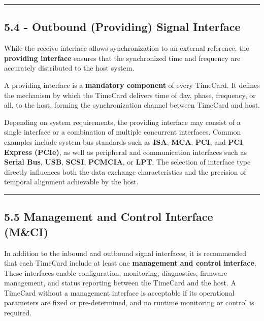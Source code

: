 \documentclass[
]{article}
\begin{document}
\begin{center}\rule{0.5\linewidth}{0.5pt}\end{center}

\subsection{5.4 - Outbound (Providing) Signal
Interface}\label{outbound-providing-signal-interface}

While the receive interface allows synchronization to an external
reference, the \textbf{providing interface} ensures that the
synchronized time and frequency are accurately distributed to the host
system.

A providing interface is a \textbf{mandatory component} of every
TimeCard. It defines the mechanism by which the TimeCard delivers time
of day, phase, frequency, or all, to the host, forming the
synchronization channel between TimeCard and host.

Depending on system requirements, the providing interface may consist of
a single interface or a combination of multiple concurrent interfaces.
Common examples include system bus standards such as \textbf{ISA},
\textbf{MCA}, \textbf{PCI}, and \textbf{PCI Express (PCIe)}, as well as
peripheral and communication interfaces such as \textbf{Serial Bus},
\textbf{USB}, \textbf{SCSI}, \textbf{PCMCIA}, or \textbf{LPT}. The
selection of interface type directly influences both the data exchange
characteristics and the precision of temporal alignment achievable by
the host.

\begin{center}\rule{0.5\linewidth}{0.5pt}\end{center}

\subsection{5.5 Management and Control Interface
(M\&CI)}\label{management-and-control-interface-mci}

In addition to the inbound and outbound signal interfaces, it is
recommended that each TimeCard include at least one \textbf{management
and control interface}. These interfaces enable configuration,
monitoring, diagnostics, firmware management, and status reporting
between the TimeCard and the host. A TimeCard without a management
interface is acceptable if its operational parameters are fixed or
pre-determined, and no runtime monitoring or control is required.
\end{document}
